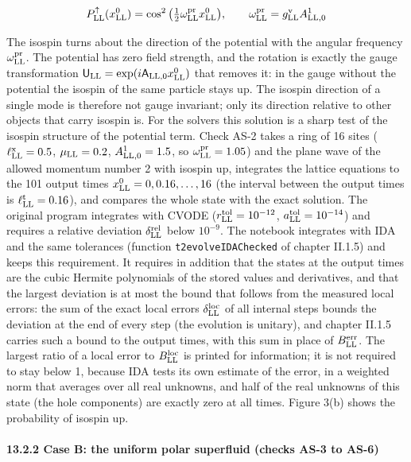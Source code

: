\documentclass[
  10pt,
]{article}
\begin{document}
\[P^\uparrow_{\rm LL}(x^0_{\rm LL})=\cos^2\big(\tfrac12\omega^{\rm pr}_{\rm LL}x^0_{\rm LL}\big),\qquad\omega^{\rm pr}_{\rm LL}=g^{\rm v}_{\rm LL}A^1_{{\rm LL},0}\]

The isospin turns about the direction of the potential with the angular
frequency \(\omega^{\rm pr}_{\rm LL}\). The potential has zero field
strength, and the rotation is exactly the gauge transformation
\(\mathsf U_{\rm LL}=\exp(i\mathsf A_{{\rm LL},0}x^0_{\rm LL})\) that
removes it: in the gauge without the potential the isospin of the same
particle stays up. The isospin direction of a single mode is therefore
not gauge invariant; only its direction relative to other objects that
carry isospin is. For the solvers this solution is a sharp test of the
isospin structure of the potential term. Check AS-2 takes a ring of 16
sites (\(\ell^{\rm x}_{\rm LL}=0.5\), \(\mu_{\rm LL}=0.2\),
\(A^1_{{\rm LL},0}=1.5\), so \(\omega^{\rm pr}_{\rm LL}=1.05\)) and the
plane wave of the allowed momentum number 2 with isospin up, integrates
the lattice equations to the 101 output times
\(x^0_{\rm LL}=0,0.16,\dots,16\) (the interval between the output times
is \(\ell^{\rm t}_{\rm LL}=0.16\)), and compares the whole state with
the exact solution. The original program integrates with CVODE
(\(r^{\rm tol}_{\rm LL}=10^{-12}\), \(a^{\rm tol}_{\rm LL}=10^{-14}\))
and requires a relative deviation \(\delta^{\rm rel}_{\rm LL}\) below
\(10^{-9}\). The notebook integrates with IDA and the same tolerances
(function \texttt{t2evolveIDAChecked} of chapter II.1.5) and keeps this
requirement. It requires in addition that the states at the output times
are the cubic Hermite polynomials of the stored values and derivatives,
and that the largest deviation is at most the bound that follows from
the measured local errors: the sum of the exact local errors
\(\delta^{\rm loc}_{\rm LL}\) of all internal steps bounds the deviation
at the end of every step (the evolution is unitary), and chapter II.1.5
carries such a bound to the output times, with this sum in place of
\(B^{\rm err}_{\rm LL}\). The largest ratio of a local error to
\(B^{\rm loc}_{\rm LL}\) is printed for information; it is not required
to stay below 1, because IDA tests its own estimate of the error, in a
weighted norm that averages over all real unknowns, and half of the real
unknowns of this state (the hole components) are exactly zero at all
times. Figure 3(b) shows the probability of isospin up.

\hypertarget{case-b-the-uniform-polar-superfluid-checks-as-3-to-as-6}{%
\paragraph{13.2.2 Case B: the uniform polar superfluid (checks AS-3 to
AS-6)}\label{case-b-the-uniform-polar-superfluid-checks-as-3-to-as-6}}
\end{document}
